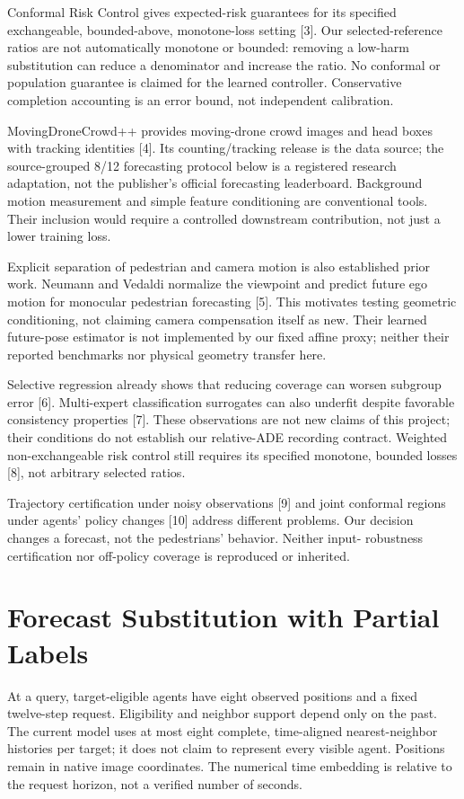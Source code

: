 \documentclass[10pt,twocolumn,letterpaper]{article}
\begin{document}
Conformal Risk Control gives expected-risk guarantees for its specified exchangeable, bounded-above, monotone-loss setting [3]. Our selected-reference ratios are not automatically monotone or bounded: removing a low-harm substitution can reduce a denominator and increase the ratio. No conformal or population guarantee is claimed for the learned controller. Conservative completion accounting is an error bound, not independent calibration.


MovingDroneCrowd++ provides moving-drone crowd images and head boxes with tracking identities [4]. Its counting/tracking release is the data source; the source-grouped 8/12 forecasting protocol below is a registered research adaptation, not the publisher's official forecasting leaderboard. Background motion measurement and simple feature conditioning are conventional tools. Their inclusion would require a controlled downstream contribution, not just a lower training loss.


Explicit separation of pedestrian and camera motion is also established prior work. Neumann and Vedaldi normalize the viewpoint and predict future ego motion for monocular pedestrian forecasting [5]. This motivates testing geometric conditioning, not claiming camera compensation itself as new. Their learned future-pose estimator is not implemented by our fixed affine proxy; neither their reported benchmarks nor physical geometry transfer here.


Selective regression already shows that reducing coverage can worsen subgroup error [6]. Multi-expert classification surrogates can also underfit despite favorable consistency properties [7]. These observations are not new claims of this project; their conditions do not establish our relative-ADE recording contract. Weighted non-exchangeable risk control still requires its specified monotone, bounded losses [8], not arbitrary selected ratios.


Trajectory certification under noisy observations [9] and joint conformal regions under agents' policy changes [10] address different problems. Our decision changes a forecast, not the pedestrians' behavior. Neither input- robustness certification nor off-policy coverage is reproduced or inherited.


\section{Forecast Substitution with Partial Labels}

At a query, target-eligible agents have eight observed positions and a fixed twelve-step request. Eligibility and neighbor support depend only on the past. The current model uses at most eight complete, time-aligned nearest-neighbor histories per target; it does not claim to represent every visible agent. Positions remain in native image coordinates. The numerical time embedding is relative to the request horizon, not a verified number of seconds.
\end{document}
